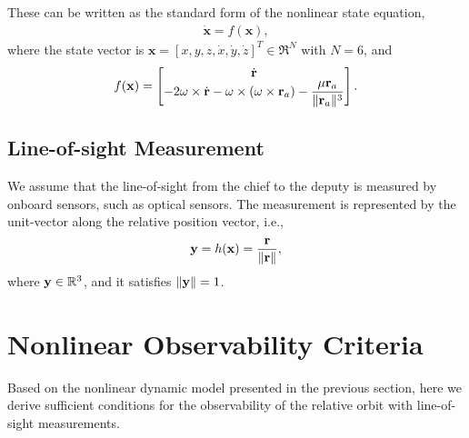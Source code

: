These can be written as the standard form of the nonlinear state equation,
\begin{align}
\dot{\mathbf{x}} = f (\mathbf{x}), \label{eqn:xxdot}
\end{align}
where the state vector is $\mathbf{x}=[x,y,z,\dot x, \dot y,\dot z]^T\in\Re^N$ with $N=6$, and
\begin{align}
f(\mathbf{x}) 
=\begin{bmatrix}
\dot {\mathbf{r}} \\
-2\omega\times \dot{\mathbf{r}} - \omega\times(\omega\times \mathbf{r}_a) -\dfrac{\mu \mathbf{r}_a}{\|\mathbf{r}_a\|^3}
\end{bmatrix}.\label{eqn:f}
\end{align}

\subsection{Line-of-sight Measurement}

We assume that the line-of-sight from the chief to the deputy is measured by onboard sensors, such as optical sensors. The measurement is represented by the unit-vector along the relative position vector, i.e.,
\begin{align}
\mathbf{y} = h(\mathbf{x}) =\frac{\mathbf{r}}{\|\mathbf{r}\|},\label{eqn:y}
\end{align}
where $\mathbf{y}\in\mathbb{R}^3$, and it satisfies $\|\mathbf{y}\|=1$.

\section{Nonlinear Observability Criteria}\label{sec:OC}

Based on the nonlinear dynamic model presented in the previous section, here we derive sufficient conditions for the observability of the relative orbit with line-of-sight measurements.



